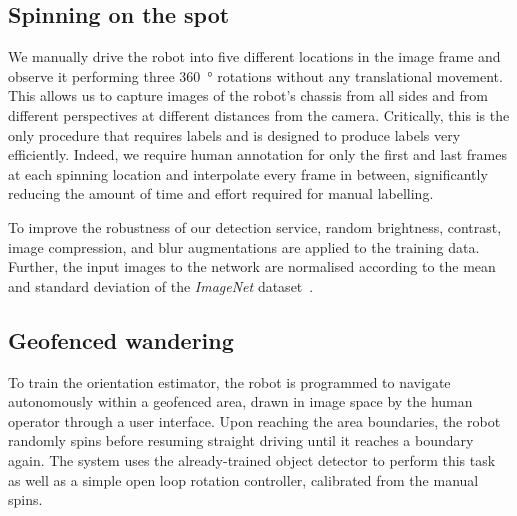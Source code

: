 \documentclass[conference]{ieeeconf}
\begin{document}



\subsection{Spinning on the spot}
\label{sec:obj_det_training}

We manually drive the robot into five different locations in the image frame and observe it performing three \SI{360}{\degree} rotations without any translational movement.
This allows us to capture images of the robot's chassis from all sides and from different perspectives at different distances from the camera.
Critically, this is the only procedure that requires labels and is designed to produce labels very efficiently.
Indeed, we require human annotation for only the first and last frames at each spinning location and interpolate every frame in between, significantly reducing the amount of time and effort required for manual labelling.

To improve the robustness of our detection service, random brightness, contrast, image compression, and blur augmentations are applied to the training data.
Further, the input images to the network are normalised according to the mean and standard deviation of the \textit{ImageNet} dataset~\cite{deng2009imagenet}.

\subsection{Geofenced wandering}
\label{sec:orient_training}

To train the orientation estimator, the robot is programmed to navigate autonomously within a geofenced area, drawn in image space by the human operator through a user interface.
Upon reaching the area boundaries, the robot randomly spins before resuming straight driving until it reaches a boundary again.
The system uses the already-trained object detector to perform this task as well as a simple open loop rotation controller, calibrated from the manual spins.
\end{document}
